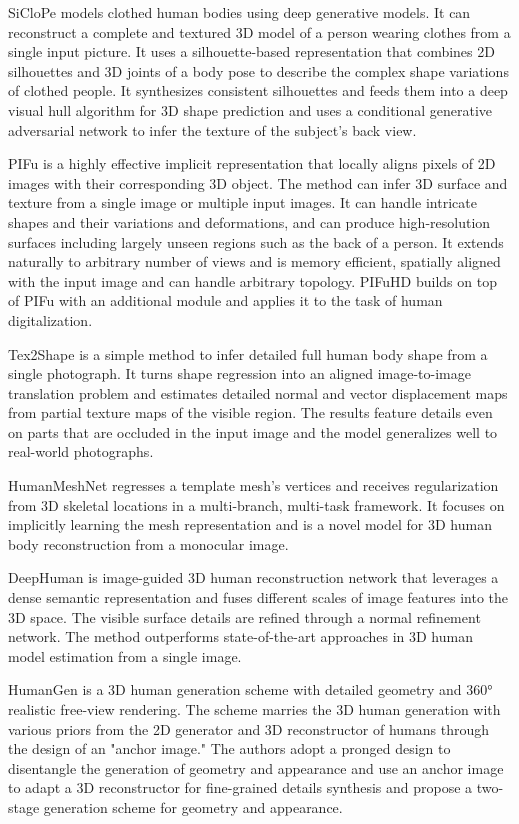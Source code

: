 SiCloPe \cite{SiCloPe} models clothed human bodies using deep generative
models. It can reconstruct a complete and textured 3D model of a person wearing
clothes from a single input picture. It uses a silhouette-based representation
that combines 2D silhouettes and 3D joints of a body pose to describe the
complex shape variations of clothed people. It synthesizes consistent
silhouettes and feeds them into a deep visual hull algorithm for 3D shape
prediction and uses a conditional generative adversarial network to infer the
texture of the subject's back view.

PIFu \cite{PIFu} is a highly effective implicit representation that locally
aligns pixels of 2D images with their corresponding 3D object. The method can
infer 3D surface and texture from a single image or multiple input images. It
can handle intricate shapes and their variations and deformations, and can
produce high-resolution surfaces including largely unseen regions such as the
back of a person. It extends naturally to arbitrary number of views and is
memory efficient, spatially aligned with the input image and can handle
arbitrary topology. PIFuHD \cite{PIFuHD} builds on top of PIFu with an
additional module and applies it to the task of human digitalization.

Tex2Shape \cite{Tex2Shape} is a simple method to infer detailed full human body
shape from a single photograph. It turns shape regression into an aligned
image-to-image translation problem and estimates detailed normal and vector
displacement maps from partial texture maps of the visible region. The results
feature details even on parts that are occluded in the input image and the
model generalizes well to real-world photographs.

HumanMeshNet \cite{HumanMeshNet} regresses a template mesh's vertices and
receives regularization from 3D skeletal locations in a multi-branch,
multi-task framework. It focuses on implicitly learning the mesh representation
and is a novel model for 3D human body reconstruction from a monocular image.

DeepHuman \cite{DeepHuman} is image-guided 3D human reconstruction network that
leverages a dense semantic representation and fuses different scales of image
features into the 3D space. The visible surface details are refined through a
normal refinement network. The method outperforms state-of-the-art approaches
in 3D human model estimation from a single image.

HumanGen \cite{humangen} is a 3D human generation scheme with detailed geometry
and 360° realistic free-view rendering. The scheme marries the 3D human
generation with various priors from the 2D generator and 3D reconstructor of
humans through the design of an "anchor image." The authors adopt a pronged
design to disentangle the generation of geometry and appearance and use an
anchor image to adapt a 3D reconstructor for fine-grained details synthesis and
propose a two-stage generation scheme for geometry and appearance.

